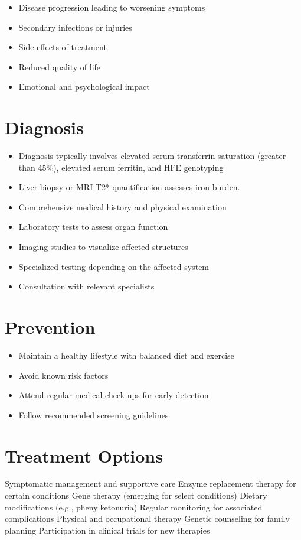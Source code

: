 \begin{itemize}[noitemsep]
  \item Disease progression leading to worsening symptoms
  \item Secondary infections or injuries
  \item Side effects of treatment
  \item Reduced quality of life
  \item Emotional and psychological impact
\end{itemize}
\section{Diagnosis}
\begin{itemize}[noitemsep]
  \item Diagnosis typically involves elevated serum transferrin saturation (greater than 45\%), elevated serum ferritin, and HFE genotyping
  \item Liver biopsy or MRI T2* quantification assesses iron burden.
  \item Comprehensive medical history and physical examination
  \item Laboratory tests to assess organ function
  \item Imaging studies to visualize affected structures
  \item Specialized testing depending on the affected system
  \item Consultation with relevant specialists
\end{itemize}
\section{Prevention}
\begin{itemize}[noitemsep]
  \item Maintain a healthy lifestyle with balanced diet and exercise
  \item Avoid known risk factors
  \item Attend regular medical check-ups for early detection
  \item Follow recommended screening guidelines
\end{itemize}
\section{Treatment Options}
Symptomatic management and supportive care Enzyme replacement therapy for certain conditions Gene therapy (emerging for select conditions) Dietary modifications (e.g., phenylketonuria) Regular monitoring for associated complications Physical and occupational therapy Genetic counseling for family planning Participation in clinical trials for new therapies

